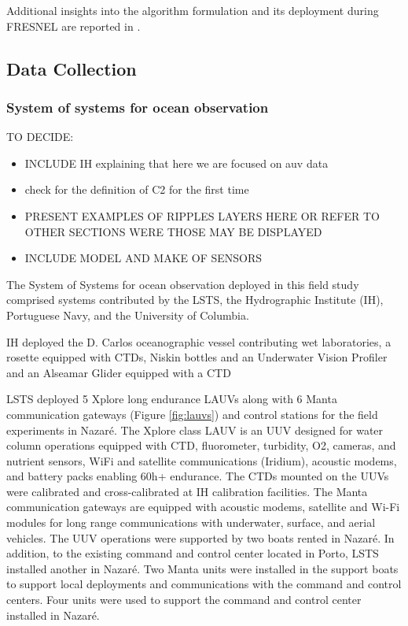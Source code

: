 Additional insights into the algorithm formulation and its deployment during FRESNEL are reported in \cite{bernacchi2025}.

\subsection{Data Collection}

\subsubsection{System of systems for ocean observation}

TO DECIDE: 
\begin{itemize}
    \item INCLUDE IH explaining that here we are focused on auv data
    \item check for the definition of C2 for the first time
    \item PRESENT EXAMPLES OF RIPPLES LAYERS HERE OR REFER TO OTHER SECTIONS WERE THOSE MAY BE DISPLAYED
    \item INCLUDE MODEL AND MAKE OF SENSORS
\end{itemize}

The System of Systems for ocean observation deployed in this field study comprised systems contributed by the LSTS, the Hydrographic Institute (IH), Portuguese Navy, and the University of Columbia.

IH deployed the D. Carlos oceanographic vessel contributing wet laboratories, a rosette equipped with CTDs, Niskin bottles and an Underwater Vision Profiler %
and an Alseamar Glider equipped with a CTD %

LSTS deployed 5 Xplore long endurance LAUVs  along with 6 Manta communication gateways (Figure \ref{fig:lauvs}) and control stations for the field experiments in Nazaré. The Xplore class LAUV \cite{lauvurl} 
is an UUV designed for water column operations equipped with CTD, fluorometer, turbidity, O2, cameras, and nutrient sensors, WiFi and satellite communications (Iridium), acoustic modems, and battery packs enabling 60h+ endurance. The CTDs mounted on the UUVs were calibrated and cross-calibrated at IH calibration facilities. The Manta communication gateways \cite{} 
are equipped with acoustic modems, satellite and Wi-Fi modules for long range communications with underwater, surface, and aerial vehicles. The UUV operations were supported by two boats rented in Nazaré. In addition, to the existing command and control center located in Porto, LSTS installed another in Nazaré. Two Manta units were installed in the support boats to support local deployments and communications with the command and control centers. Four units were used to support the command and control center installed in Nazaré.

